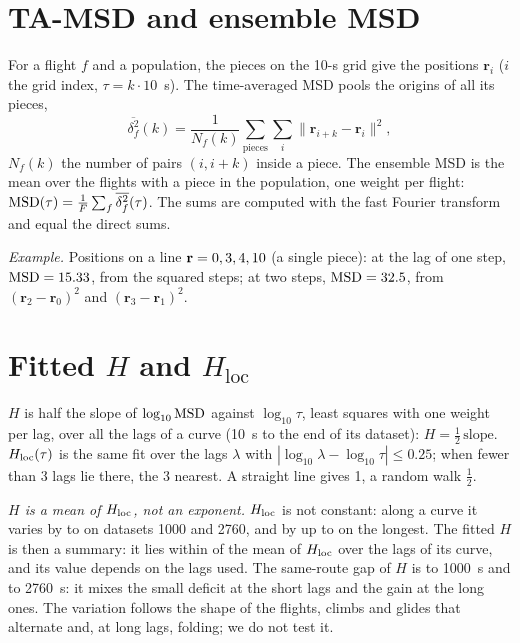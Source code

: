\section{TA-MSD and ensemble MSD}\label{app:tamsd}

For a flight $f$ and a population, the pieces on the 10-s grid give the positions $\mathbf r_i$ ($i$ the grid index, $\tau=k\cdot10$~s). The time-averaged MSD pools the origins of all its pieces,
\[
  \overline{\delta^2_f}(k)=\frac{1}{N_f(k)}\sum_{\text{pieces}}\sum_{i}\bigl\|\mathbf r_{i+k}-\mathbf r_i\bigr\|^2,
\]
$N_f(k)$ the number of pairs $(i,i+k)$ inside a piece. The ensemble MSD is the mean over the flights with a piece in the population, one weight per flight:
$\mathrm{MSD}(\tau)=\frac1F\sum_f\overline{\delta^2_f}(\tau)$. The sums are computed with the fast Fourier transform and equal the direct sums.

\emph{Example.} Positions on a line $\mathbf r=0, 3, 4, 10$ (a single piece): at the lag of one step, $\mathrm{MSD}=15.33$, from the squared steps; at two steps, $\mathrm{MSD}=32.5$, from $(\mathbf r_2-\mathbf r_0)^2$ and $(\mathbf r_3-\mathbf r_1)^2$.

\section{Fitted \texorpdfstring{$H$}{H} and \texorpdfstring{$H_\mathrm{loc}$}{H\_loc}}\label{app:hloc}

$H$ is half the slope of $\log_{10}\mathrm{MSD}$ against $\log_{10}\tau$, least squares with one weight per lag, over all the lags of a curve (10~s to the end of its dataset):
$H=\tfrac12\,\mathrm{slope}$. $H_\mathrm{loc}(\tau)$ is the same fit over the lags $\lambda$ with $|\log_{10}\lambda-\log_{10}\tau|\le0.25$; when fewer than 3 lags lie there, the 3 nearest. A straight line gives 1, a random walk $\tfrac12$.

\emph{$H$ is a mean of $H_\mathrm{loc}$, not an exponent.} $H_\mathrm{loc}$ is not constant: along a curve it varies by \RawHlocRangeLow{} to \RawHlocRangeHigh{} on datasets 1000 and 2760, and by up to \RawHlocRangeLong{} on the longest. The fitted $H$ is then a summary: it lies within \RawHMeanGap{} of the mean of $H_\mathrm{loc}$ over the lags of its curve, and its value depends on the lags used. The same-route gap of $H$ is \MatDeltaFitKG{} to 1000~s and \MatDeltaFitTG{} to 2760~s: it mixes the small deficit at the short lags and the gain at the long ones.
The variation follows the shape of the flights, climbs and glides that alternate and, at long lags, folding; we do not test it.

